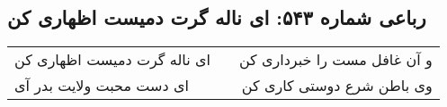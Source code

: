 \begin{center}
\section*{رباعی شماره ۵۴۳: ای ناله گرت دمیست اظهاری کن}
\label{sec:sh543}
\begin{longtable}{l p{0.5cm} r}
ای ناله گرت دمیست اظهاری کن
&&
و آن غافل مست را خبرداری کن
\\
ای دست محبت ولایت بدر آی
&&
وی باطن شرع دوستی کاری کن
\\
\end{longtable}
\end{center}
